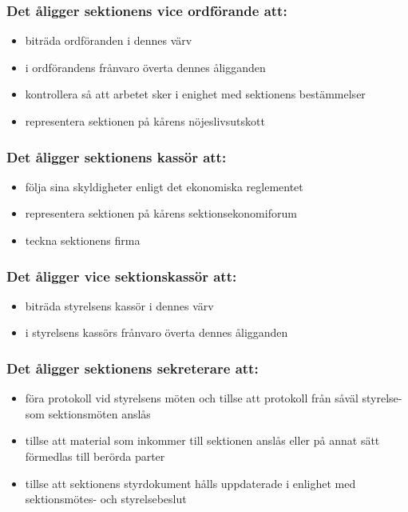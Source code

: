 \subsubsection{Det åligger sektionens vice ordförande att:}

\begin{itemize}
  \item biträda ordföranden i dennes värv 
  \item i ordförandens frånvaro överta dennes åligganden 
  \item kontrollera så att arbetet sker i enighet med sektionens bestämmelser 
  \item representera sektionen på kårens nöjeslivsutskott
\end{itemize}

\subsubsection{Det åligger sektionens kassör att:}

\begin{itemize}
  \item följa sina skyldigheter enligt det ekonomiska reglementet
  \item representera sektionen på kårens sektionsekonomiforum
  \item teckna sektionens firma
\end{itemize}

\subsubsection{Det åligger vice sektionskassör att:}

\begin{itemize}
  \item biträda styrelsens kassör i dennes värv
  \item i styrelsens kassörs frånvaro överta dennes åligganden
\end{itemize}

\subsubsection{Det åligger sektionens sekreterare att:}

\begin{itemize}
  \item föra protokoll vid styrelsens möten och tillse att protokoll från såväl styrelse- som sektionsmöten anslås
  \item tillse att material som inkommer till sektionen anslås eller på annat sätt förmedlas till berörda parter
  \item tillse att sektionens styrdokument hålls uppdaterade i enlighet med sektionsmötes- och styrelsebeslut
\end{itemize}

